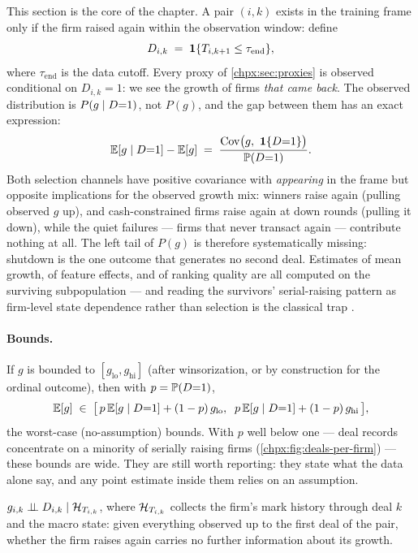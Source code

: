 This section is the core of the chapter. A pair $(i,k)$ exists in the training frame only if the
firm raised again within the observation window: define
\begin{equation}\label{eq:us-selind}
D_{i,k} \;=\; \mathbf{1}\{T_{i,k+1} \le \tau_{\mathrm{end}}\},
\end{equation}
where $\tau_{\mathrm{end}}$ is the data cutoff. Every proxy of \cref{chpx:sec:proxies} is
observed conditional on $D_{i,k} = 1$: we see the growth of firms \emph{that came back}. The
observed distribution is $P(g \mid D{=}1)$, not $P(g)$, and the gap between them has an exact
expression:
\begin{equation}\label{eq:us-selbias}
\mathbb{E}[g \mid D{=}1] - \mathbb{E}[g]
\;=\; \frac{\operatorname{Cov}\!\big(g,\ \mathbf{1}\{D{=}1\}\big)}{\mathbb{P}(D{=}1)} .
\end{equation}
Both selection channels have positive covariance with \emph{appearing} in the frame but opposite
implications for the observed growth mix: winners raise again (pulling observed $g$ up), and
cash-constrained firms raise again at down rounds (pulling it down), while the quiet failures
--- firms that never transact again --- contribute nothing at all. The left tail of $P(g)$ is
therefore systematically missing: shutdown is the one outcome that generates no second deal.
Estimates of mean growth, of feature effects, and of ranking quality are all computed on the
surviving subpopulation --- and reading the survivors' serial-raising pattern as firm-level
state dependence rather than selection is the classical trap \citep{heckmanborjas1980}.

\paragraph{Bounds.} If $g$ is bounded to $[g_{\mathrm{lo}}, g_{\mathrm{hi}}]$ (after
winsorization, or by construction for the ordinal outcome), then with $p = \mathbb{P}(D{=}1)$,
\begin{equation}\label{eq:us-bounds}
\mathbb{E}[g] \;\in\; \big[\, p\,\mathbb{E}[g \mid D{=}1] + (1-p)\,g_{\mathrm{lo}},\;\;
p\,\mathbb{E}[g \mid D{=}1] + (1-p)\,g_{\mathrm{hi}} \,\big],
\end{equation}
the worst-case (no-assumption) bounds. With $p$ well below one --- deal records concentrate on
a minority of serially raising firms (\cref{chpx:fig:deals-per-firm}) --- these bounds are
wide. They are still worth reporting: they state what the data alone say, and any point
estimate inside them relies on an assumption.

\begin{assumption}\label{ass:us-soh}
$g_{i,k} \perp\!\!\!\perp D_{i,k} \mid \mathcal{H}_{T_{i,k}}$, where $\mathcal{H}_{T_{i,k}}$ collects the firm's mark
history through deal $k$ and the macro state: given everything observed up to the first deal of
the pair, whether the firm raises again carries no further information about its growth.
\end{assumption}

